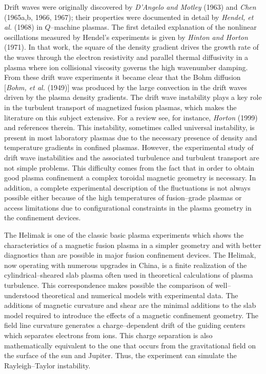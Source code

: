 \documentclass[a4paper,openany,12pt]{book}
\begin{document}
Drift waves were originally discovered by \emph{D'Angelo and Motley} (1963) and \emph{Chen} (1965a,b, 1966, 1967); their properties were documented in detail by \emph{Hendel, et al.} (1968) in 
$Q$--machine plasmas. The first detailed explanation of the nonlinear oscillations measured by Hendel's experiments is given by \emph{Hinton and Horton} (1971). In that work, the square of the density gradient drives the growth rate of the waves through the electron resistivity and parallel thermal diffusivity in a plasma where ion collisional viscosity governs the high wavenumber damping. From these drift wave experiments it became clear that the Bohm diffusion [\emph{Bohm, et al.} (1949)] was produced by the large convection in the drift waves driven by the plasma density gradients. The drift wave instability plays a key role in the turbulent transport of magnetized fusion plasmas, which makes the literature on this subject extensive. For a review see, for instance, \emph{Horton} (1999) and references therein. This instability, sometimes called universal instability, is present in most laboratory plasmas due to the necessary presence of density and temperature gradients in confined plasmas. However, the experimental study of drift wave instabilities and the associated turbulence and turbulent transport are not simple problems. This difficulty comes from the fact that in order to obtain good plasma confinement a complex toroidal magnetic geometry is necessary. In addition, a complete experimental description of the fluctuations is not always possible either because of the high temperatures of fusion--grade plasmas or access limitations due to configurational constraints in the plasma geometry in the confinement devices. 

The Helimak is one of the classic basic plasma experiments which shows the characteristics of a magnetic fusion plasma in a simpler geometry and with better diagnostics than are possible in major fusion confinement devices. The Helimak, now operating with numerous upgrades in China, is a finite realization of the cylindrical--sheared slab plasma often used in theoretical calculations of plasma turbulence. This correspondence makes possible the comparison of well--understood theoretical and numerical models with experimental data. The additions of magnetic curvature and shear are the minimal additions to the slab model required to introduce the effects of a magnetic confinement geometry. The field line curvature generates a charge--dependent drift of the guiding centers which separates electrons from ions. This charge separation is also mathematically equivalent to the one that occurs from the gravitational field on the surface of the sun and Jupiter. Thus, the experiment can simulate the Rayleigh--Taylor instability. 
\end{document}
